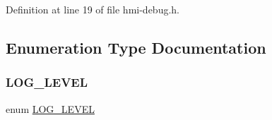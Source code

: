 Definition at line 19 of file hmi-\/debug.\+h.



\subsection{Enumeration Type Documentation}
\mbox{\label{hmi-debug_8h_aa5a9053636a30269210c54e734e0d583}} 
\subsubsection{\texorpdfstring{L\+O\+G\+\_\+\+L\+E\+V\+EL}{LOG\_LEVEL}}
{\footnotesize\ttfamily enum \hyperlink{hmi-debug_8h_aa5a9053636a30269210c54e734e0d583}{L\+O\+G\+\_\+\+L\+E\+V\+EL}}

